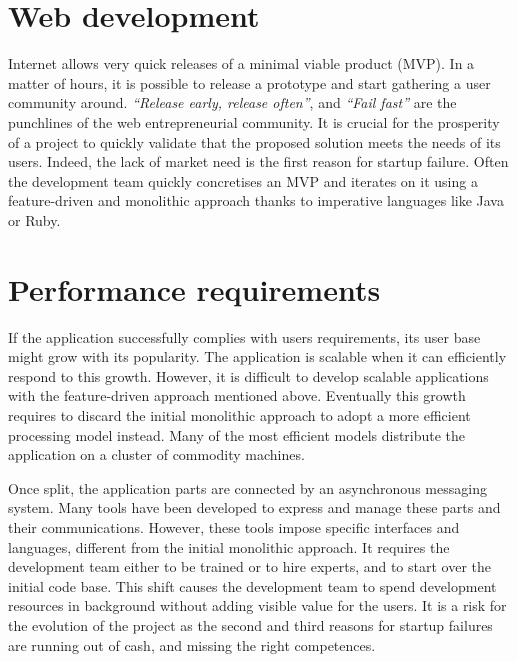 \section{Web development}

Internet allows very quick releases of a minimal viable product (MVP).
In a matter of hours, it is possible to release a prototype and start gathering a user community around.
\textit{``Release early, release often''}, and \textit{``Fail fast''} are the punchlines of the web entrepreneurial community.
It is crucial for the prosperity of a project to quickly validate that the proposed solution meets the needs of its users.
Indeed, the lack of market need is the first reason for startup failure.
Often the development team quickly concretises an MVP and iterates on it using a feature-driven and monolithic approach thanks to imperative languages like Java or Ruby.

\section{Performance requirements}

If the application successfully complies with users requirements, its user base might grow with its popularity.
The application is scalable when it can efficiently respond to this growth.
However, it is difficult to develop scalable applications with the feature-driven approach mentioned above.
Eventually this growth requires to discard the initial monolithic approach to adopt a more efficient processing model instead.
Many of the most efficient models distribute the application on a cluster of commodity machines.

Once split, the application parts are connected by an asynchronous messaging system.
Many tools have been developed to express and manage these parts and their communications.
However, these tools impose specific interfaces and languages, different from the initial monolithic approach.
It requires the development team either to be trained or to hire experts, and to start over the initial code base.
This shift causes the development team to spend development resources in background without adding visible value for the users.
It is a risk for the evolution of the project as the second and third reasons for startup failures are running out of cash, and missing the right competences.

